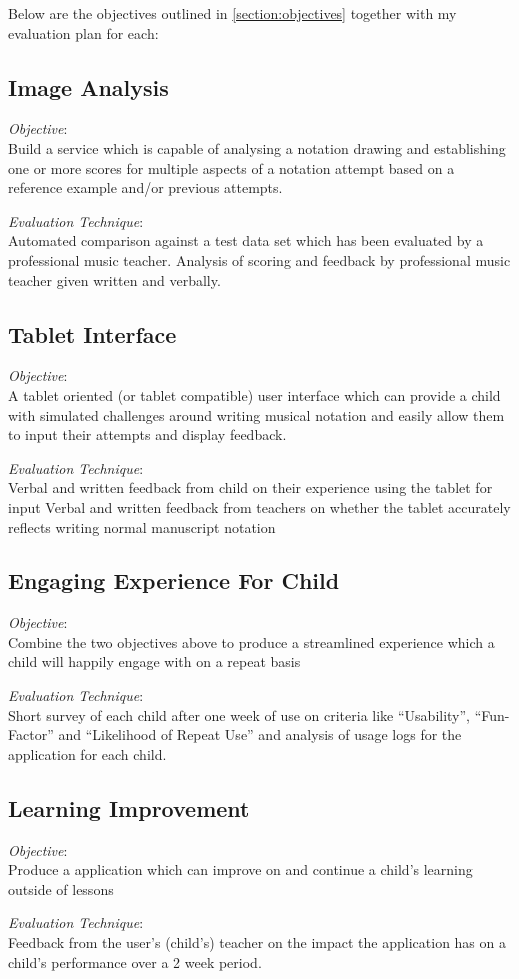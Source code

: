 Below are the objectives outlined in \ref{section:objectives} together with my evaluation plan for each:

\subsection{Image Analysis}

\emph{Objective}: \\
Build a service which is capable of analysing a notation drawing and establishing one or more scores for multiple aspects of a notation attempt based on a reference example and/or previous attempts.

\emph{Evaluation Technique}: \\
Automated comparison against a test data set which has been evaluated by a professional music teacher.
Analysis of scoring and feedback by professional music teacher given written and verbally.

\subsection{Tablet Interface}

\emph{Objective}: \\
A tablet oriented (or tablet compatible) user interface which can provide a child with simulated challenges around writing musical notation and easily allow them to input their attempts and display feedback.

\emph{Evaluation Technique}: \\
Verbal and written feedback from child on their experience using the tablet for input
Verbal and written feedback from teachers on whether the tablet accurately reflects writing normal manuscript notation

\subsection{Engaging Experience For Child}

\emph{Objective}: \\
Combine the two objectives above to produce a streamlined experience which a child will happily engage with on a repeat basis

\emph{Evaluation Technique}: \\
Short survey of each child after one week of use on criteria like ``Usability'', ``Fun-Factor'' and ``Likelihood of Repeat Use'' and analysis of usage logs for the application for each child.

\subsection{Learning Improvement}

\emph{Objective}: \\
Produce a application which can improve on and continue a child's learning outside of lessons

\emph{Evaluation Technique}: \\
Feedback from the user's (child's) teacher on the impact the application has on a child's performance over a 2 week period.
